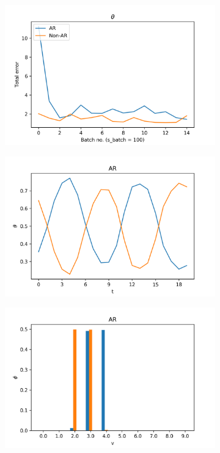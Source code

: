 \documentclass[12pt]{article}
\begin{document}
\begin{figure}[H]
\end{figure}

\begin{figure}[H]
  \centering
  \begin{subfigure}[b]{0.3\textwidth}
    \includegraphics[width=\linewidth]{performance_thetas_experiment-1|overlapping-yes_dataset-10.png}
  \end{subfigure}%
  \begin{subfigure}[b]{0.3\textwidth}
    \includegraphics[width=\linewidth]{latent_thetas_AR_experiment-1|overlapping-yes_dataset-10.png}
  \end{subfigure}%
  \begin{subfigure}[b]{0.3\textwidth}
    \includegraphics[width=\linewidth]{latent_phis_AR_experiment-1|overlapping-yes_dataset-10.png}

\end{subfigure}
\end{figure}
\end{document}
